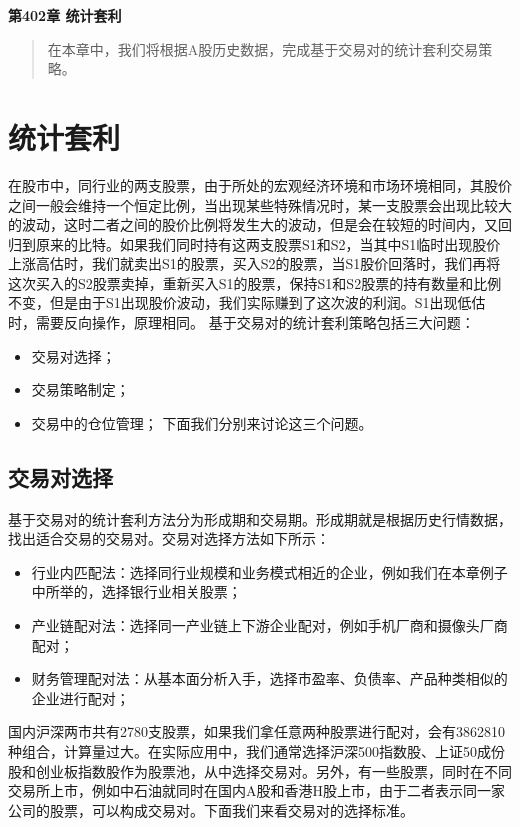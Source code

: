 \newpage
\maketitle
\begin{center}
\Large \textbf{第402章 统计套利} \quad 
\end{center}
\begin{abstract}
在本章中，我们将根据A股历史数据，完成基于交易对的统计套利交易策略。
\end{abstract}
\section{统计套利}
在股市中，同行业的两支股票，由于所处的宏观经济环境和市场环境相同，其股价之间一般会维持一个恒定比例，当出现某些特殊情况时，某一支股票会出现比较大的波动，这时二者之间的股价比例将发生大的波动，但是会在较短的时间内，又回归到原来的比特。如果我们同时持有这两支股票S1和S2，当其中S1临时出现股价上涨高估时，我们就卖出S1的股票，买入S2的股票，当S1股价回落时，我们再将这次买入的S2股票卖掉，重新买入S1的股票，保持S1和S2股票的持有数量和比例不变，但是由于S1出现股价波动，我们实际赚到了这次波的利润。S1出现低估时，需要反向操作，原理相同。\newline
基于交易对的统计套利策略包括三大问题：
\begin{itemize}
\item 交易对选择；
\item 交易策略制定；
\item 交易中的仓位管理；
下面我们分别来讨论这三个问题。
\end{itemize}
\subsection{交易对选择}
基于交易对的统计套利方法分为形成期和交易期。形成期就是根据历史行情数据，找出适合交易的交易对。交易对选择方法如下所示：
\begin{itemize}
\item 行业内匹配法：选择同行业规模和业务模式相近的企业，例如我们在本章例子中所举的，选择银行业相关股票；
\item 产业链配对法：选择同一产业链上下游企业配对，例如手机厂商和摄像头厂商配对；
\item 财务管理配对法：从基本面分析入手，选择市盈率、负债率、产品种类相似的企业进行配对；
\end{itemize}
国内沪深两市共有2780支股票，如果我们拿任意两种股票进行配对，会有3862810种组合，计算量过大。在实际应用中，我们通常选择沪深500指数股、上证50成份股和创业板指数股作为股票池，从中选择交易对。另外，有一些股票，同时在不同交易所上市，例如中石油就同时在国内A股和香港H股上市，由于二者表示同一家公司的股票，可以构成交易对。下面我们来看交易对的选择标准。
